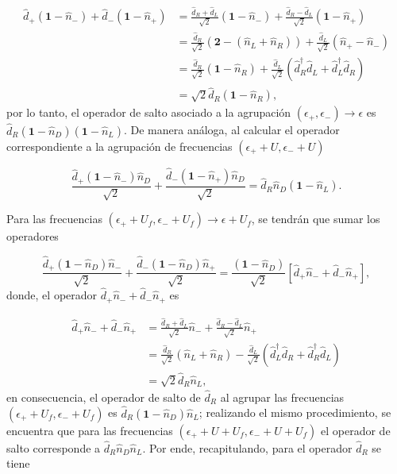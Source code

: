 \begin{appendixs}
\begin{align*}
    \hat{d}_{+}(\textbf{1}-\hat{n}_{-}) + \hat{d}_{-}(\textbf{1}-\hat{n}_{+}) & =  \frac{\hat{d}_{R} + \hat{d}_{L}}{\sqrt{2}}(\textbf{1} - \hat{n}_{-}) + \frac{\hat{d}_{R} - \hat{d}_{L}}{\sqrt{2}}(\textbf{1} - \hat{n}_{+})   \\
    & = \frac{\hat{d}_{R}}{\sqrt{2}}(\textbf{2} - (\hat{n}_{L} + \hat{n}_{R})) + \frac{\hat{d}_{L}}{\sqrt{2}} (\hat{n}_{+}-\hat{n}_{-}) \\
    & = \frac{\hat{d}_{R}}{\sqrt{2}}(\textbf{1} -  \hat{n}_{R}) + \frac{\hat{d}_{L}}{\sqrt{2}} (\hat{d}^{\dagger}_{R}\hat{d}_{L} + \hat{d}^{\dagger}_{L}\hat{d}_{R}) \\
    & = \sqrt{2}\hat{d}_{R}(\textbf{1}-\hat{n}_{R}),
\end{align*}
por lo tanto, el operador de salto asociado a la agrupación $(\epsilon_{+},\epsilon_{-}) \to \epsilon$ es $\hat{d}_{R}(\textbf{1} - \hat{n}_{D})(\textbf{1} - \hat{n}_{L})$. De manera análoga, al calcular el operador correspondiente a la agrupación de frecuencias $(\epsilon_{+}+U, \epsilon_{-}+U)$

\begin{equation*}
    \frac{\hat{d}_{+}(\textbf{1}-\hat{n}_{-})\hat{n}_{D}}{\sqrt{2}} + \frac{\hat{d}_{-}(\textbf{1}-\hat{n}_{+})\hat{n}_{D}}{\sqrt{2}}  = \hat{d}_{R}\hat{n}_{D}(\textbf{1}-\hat{n}_{L}).
\end{equation*}

Para las frecuencias $(\epsilon_{+}+U_{f},\epsilon_{-}+U_{f})\to \epsilon + U_{f}$, se tendrán que sumar los operadores 

\begin{equation*}
    \frac{\hat{d}_{+}(\textbf{1}-\hat{n}_{D})\hat{n}_{-} }{\sqrt{2}} + \frac{\hat{d}_{-}(\textbf{1}-\hat{n}_{D})\hat{n}_{+} }{\sqrt{2}} = \frac{(\textbf{1}-\hat{n}_{D})}{\sqrt{2}} [\hat{d}_{+}\hat{n}_{-} + \hat{d}_{-}\hat{n}_{+}],
\end{equation*}
donde, el operador $\hat{d}_{+}\hat{n}_{-} + \hat{d}_{-}\hat{n}_{+}$ es 

\begin{align*}
    \hat{d}_{+}\hat{n}_{-} + \hat{d}_{-}\hat{n}_{+} & = \frac{\hat{d}_{R}+\hat{d}_{L}}{\sqrt{2}}\hat{n}_{-} + \frac{\hat{d}_{R}-\hat{d}_{L}}{\sqrt{2}}\hat{n}_{+}  \\
    & = \frac{\hat{d}_{R}}{\sqrt{2}}(\hat{n}_{L}+\hat{n}_{R}) - \frac{\hat{d}_{L}}{\sqrt{2}}(\hat{d}^{\dagger}_{L}\hat{d}_{R}+\hat{d}^{\dagger}_{R}\hat{d}_{L}) \\
    & = \sqrt{2}\hat{d}_{R}\hat{n}_{L},
\end{align*}
en consecuencia, el operador de salto de $\hat{d}_{R}$ al agrupar las frecuencias $(\epsilon_{+}+U_{f}, \epsilon_{-}+U_{f})$ es $\hat{d}_{R}(\textbf{1} - \hat{n}_{D})\hat{n}_{L}$; realizando el mismo procedimiento, se encuentra que para las frecuencias $(\epsilon_{+}+U+U_{f}, \epsilon_{-}+U+U_{f})$ el operador de salto corresponde a $\hat{d}_{R}\hat{n}_{D}\hat{n}_{L}$. Por ende, recapitulando, para el operador $\hat{d}_{R}$ se tiene


\end{appendixs}
